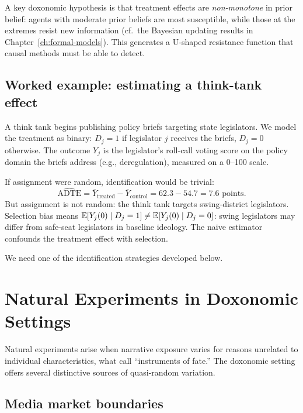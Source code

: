 A key doxonomic hypothesis is that treatment effects are \emph{non-monotone} in prior belief: agents with moderate prior beliefs are most susceptible, while those at the extremes resist new information (cf.\ the Bayesian updating results in Chapter~\ref{ch:formal-models}).
This generates a U-shaped resistance function that causal methods must be able to detect.

\subsection{Worked example: estimating a think-tank effect}

\begin{example}
\label{ex:think-tank-ate}
A think tank begins publishing policy briefs targeting state legislators.
We model the treatment as binary: $D_j = 1$ if legislator $j$ receives the briefs, $D_j = 0$ otherwise.
The outcome $Y_j$ is the legislator's roll-call voting score on the policy domain the briefs address (e.g., deregulation), measured on a 0--100 scale.

If assignment were random, identification would be trivial:
\[
  \widehat{\mathrm{ADTE}} = \bar{Y}_{\text{treated}} - \bar{Y}_{\text{control}} = 62.3 - 54.7 = 7.6 \text{ points}.
\]
But assignment is not random: the think tank targets swing-district legislators.
Selection bias means $\mathbb{E}[Y_j(0) \mid D_j = 1] \neq \mathbb{E}[Y_j(0) \mid D_j = 0]$: swing legislators may differ from safe-seat legislators in baseline ideology.
The naive estimator confounds the treatment effect with selection.

We need one of the identification strategies developed below.
\end{example}

\section{Natural Experiments in Doxonomic Settings}
\label{sec:ch16-natural}

Natural experiments arise when narrative exposure varies for reasons unrelated to individual characteristics, what \textcite{angrist2009} call ``instruments of fate.''
The doxonomic setting offers several distinctive sources of quasi-random variation.

\subsection{Media market boundaries}

